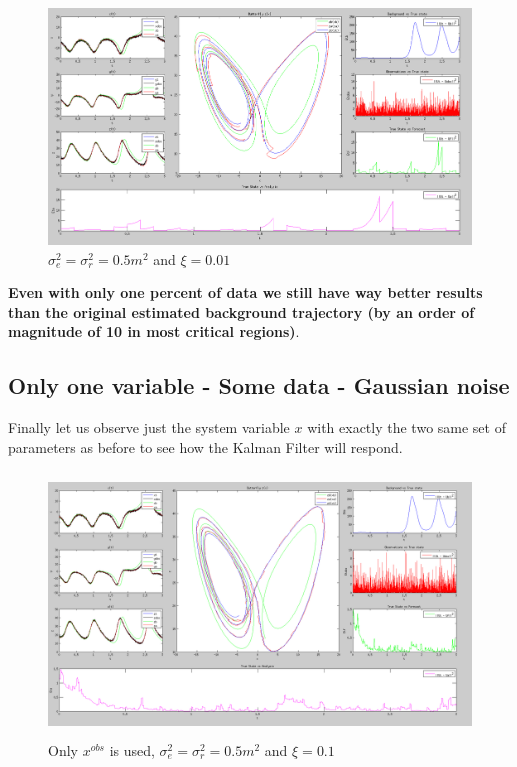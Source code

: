 \documentclass[11pt,a4paper]{article}
\begin{document}
\begin{figure}[H]
    \centering
   \includegraphics[width=14cm]{Q12b.png}
   \caption{$\sigma_e^2 = \sigma_r^2 = 0.5m^2$ and $\xi = 0.01$}
\end{figure}

\textbf{Even with only one percent of data we still have way better results than the original estimated background trajectory (by an order of magnitude of 10 in most critical regions)}. 

\clearpage
\subsection{Only one variable - Some data - Gaussian noise}

Finally let us observe just the system variable $x$ with exactly the two same set of parameters as before to see how the Kalman Filter will respond.

\begin{figure}[H]
    \centering
   \includegraphics[height=7cm]{Q13a.png}
   \caption{Only $x^{obs}$ is used, $\sigma_e^2 = \sigma_r^2 = 0.5m^2$ and $\xi = 0.1$}
\end{figure}
\end{document}
